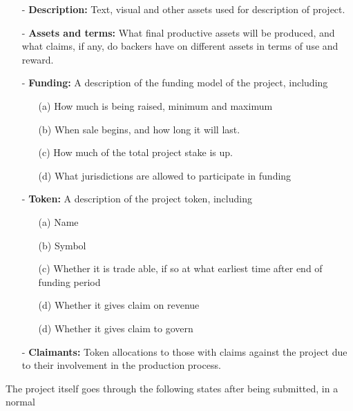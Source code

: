 \documentclass{article}
\begin{document}
\begin{itemize}
    \item[-] \textbf{Description:} Text, visual and other assets used for description of project.
    \item[-] \textbf{Assets and terms:} What final productive assets will be produced, and what claims, if any, do backers have on different assets in terms of use and reward.
    \item[-] \textbf{Funding:} A description of the funding model of the project, including

        \begin{itemize}
            \item[(a)] How much is being raised, minimum and maximum
            \item[(b)] When sale begins, and how long it will last.
            \item[(c)] How much of the total project stake is up.
            \item[(d)] What jurisdictions are allowed to participate in funding
        \end{itemize}

    \item[-] \textbf{Token:} A description of the project token, including

        \begin{itemize}
            \item[(a)] Name
            \item[(b)] Symbol
            \item[(c)] Whether it is trade able, if so at what earliest time after end of funding period
            \item[(d)] Whether it gives claim on revenue
            \item[(d)] Whether it gives claim to govern
        \end{itemize}

    \item[-] \textbf{Claimants:} Token allocations to those with claims against the project due to their involvement in the production process.

\end{itemize}

The project itself goes through the following states after being submitted, in a normal
\end{document}
